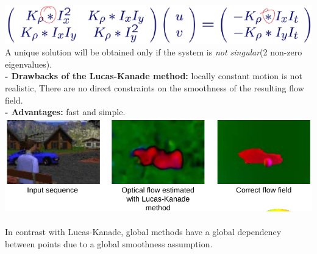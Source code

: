 \documentclass{article}
\begin{document}
\includegraphics[scale=0.3]{56.png}\\
A unique solution will be obtained only if the system is \textit{not singular}(2 non-zero eigenvalues).\\
\textbf{- Drawbacks of the Lucas-Kanade method:} locally constant motion is not realistic, There are no direct constraints on the smoothness of the resulting flow field.\\
\textbf{- Advantages:} fast and simple.\\
\includegraphics[scale=0.3]{57.png}\\\\
In contrast with Lucas-Kanade, global methods have a global dependency between points due to a global smoothness assumption.
\end{document}
